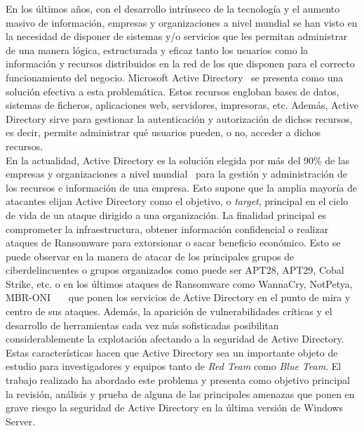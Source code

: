 En los últimos años, con el desarrollo intrínseco de la tecnología y el aumento masivo de información, empresas y organizaciones a nivel mundial se han visto en la necesidad de disponer de sistemas y/o servicios que les permitan administrar de una manera lógica, estructurada y eficaz tanto los usuarios como la información y recursos distribuidos en la red de los que disponen para el correcto funcionamiento del negocio. Microsoft Active Directory~\cite{Capitulo1:Microsoft} se presenta como una solución efectiva a esta problemática. Estos recursos engloban bases de datos, sistemas de ficheros, aplicaciones web, servidores, impresoras, etc. Además, Active Directory sirve para gestionar la autenticación y autorización de dichos recursos, es decir, permite administrar qué usuarios pueden, o no, acceder a dichos recursos.\\

En la actualidad, Active Directory es la solución elegida por más del 90\% de las empresas y organizaciones a nivel mundial~\cite{Capitulo1:Percent} para la gestión y administración de los recursos e información de una empresa. Esto supone que la amplia mayoría de atacantes elijan Active Directory como el objetivo, o {\it target}, principal en el ciclo de vida de un ataque dirigido a una organización. La finalidad principal es comprometer la infraestructura, obtener información confidencial o realizar ataques de Ransomware para extorsionar o sacar beneficio económico. Esto se puede observar en la manera de atacar de los principales grupos de ciberdelincuentes o grupos organizados como puede ser APT28, APT29, Cobal Strike, etc. o en los últimos ataques de Ransomware como WannaCry, NotPetya, MBR-ONI~\cite{Capitulo1:Ransomware}~\cite{Capitulo1:Ransomware2}~\cite{Capitulo1:Ransomware3} que ponen los servicios de Active Directory en el punto de mira y centro de sus ataques. Además, la aparición de vulnerabilidades críticas y el desarrollo de herramientas cada vez más sofisticadas posibilitan considerablemente la explotación afectando a la seguridad de Active Directory. \\

Estas características hacen que Active Directory sea un importante objeto de estudio para investigadores y equipos tanto de {\it Red Team} como {\it Blue Team}. El trabajo realizado ha abordado este problema y presenta como objetivo principal la revisión, análisis y prueba de alguna de las principales amenazas que ponen en grave riesgo la seguridad de Active Directory en la última versión de Windows Server.\\

